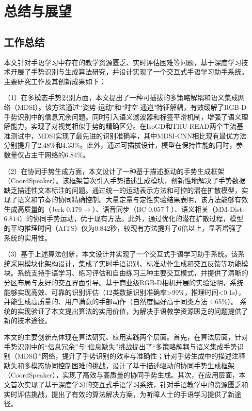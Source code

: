 
\chapter{总结与展望}
\label{sec:summary}

\section{工作总结}
本文针对手语学习中存在的教学资源匮乏、实时评估困难等问题，基于深度学习技术开展了手势识别与生成算法研究，并设计实现了一个交互式手语学习助手系统。主要研究工作及其创新成果如下：

（1）在多模态手势识别方面，本文提出了一种可插拔的多策略解耦和语义集成网络（MDSI）。该方法通过``姿势-运动"和``时空-通道"特征解耦，有效缓解了RGB-D手势识别中的信息冗余问题。同时引入语义滤波器和标签平滑机制，增强了语义理解能力，实现了对视觉相似手势的精确区分。在IsoGD和THU-READ两个主流基准测试中，MDSI实现了最先进的识别准确率，其中MDSI-CNN相比现有最优方法分别提升了2.48\%和4.33\%。此外，通过可插拔设计，模型在保持性能的同时，参数量仅占主干网络的6.84\%。

（2）在协同手势生成方面，本文设计了一种基于描述驱动的手势生成框架（CoordSpeaker）。该框架首次引入手势描述生成模块，创新性地解决了手势数据缺乏描述性文本标注的问题。通过统一的运动表示方法和可控的潜在扩散模型，实现了语义和节奏的协同精确控制。大量定量与定性实验结果表明，该方法能够有效生成高质量的（Jerk $0.179\rightarrow$）、语音同步（BC $0.057\uparrow$）、语义相关（MM-Dist: $6.814$）的协同手势运动，优于现有方法。此外，通过优化的潜在扩散过程，模型的平均推理时间（AITS）仅为0.842秒，较现有方法提升了6倍以上，显著增强了系统的实用性。

（3）基于上述算法创新，本文设计并实现了一个交互式手语学习助手系统。该系统采用模块化架构设计，集成了实时手语识别、标准动作生成和交互反馈等功能模块。系统支持手语学习、练习评估和自由练习三种主要交互模式，并提供了清晰的分区布局与友好的交互界面引导。基于商业级RGB-D相机开展的实验证明，系统能够实现高效、可靠的识别评估（12类数据识别准确率\textgreater 99\%，推理时间\textless 0.1s），并能生成高质量的、用户满意的手部动作（自然度偏好高于同类方法 4.65\%）。
系统的实现验证了本文提出算法的实用价值，为解决手语教学资源匮乏的问题提供了新的技术途径。

本文的主要创新点体现在算法研究、应用实践两个层面。首先，在算法层面，针对手势识别中的“信息冗余”与“信息缺失”挑战提出了“多策略解耦与语义集成手势识别（MDSI）”网络，提升了手势识别的效率与准确性；针对手势生成中的描述注释缺失和多模态协同控制困难的挑战，设计了基于描述驱动的协同手势生成框架（CoordSpeaker），实现了高效与高质量的协同手势生成。其次，在应用层面，本文首次实现了基于深度学习的交互式手语学习系统，针对手语教学中的资源匮乏和实时评估挑战，提出了有效的算法解决方案，为听障人士的手语学习提供了新途径。

